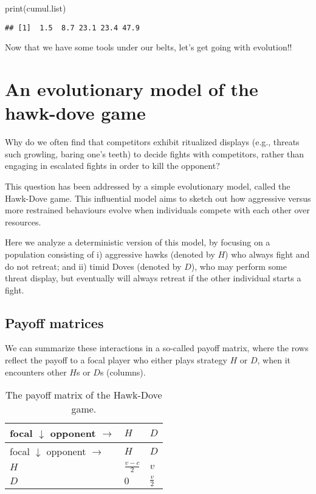 \documentclass[
]{book}
\newenvironment{Shaded}{\begin{snugshade}}{\end{snugshade}}
\newcommand{\FunctionTok}[1]{\textcolor[rgb]{0.00,0.00,0.00}{#1}}
\newcommand{\NormalTok}[1]{#1}
\begin{document}
\begin{Shaded}
\begin{Highlighting}[]
\FunctionTok{print}\NormalTok{(cumul.list)}
\end{Highlighting}
\end{Shaded}

\begin{verbatim}
## [1]  1.5  8.7 23.1 23.4 47.9
\end{verbatim}

Now that we have some tools under our belts, let's get going with evolution!!

\hypertarget{an-evolutionary-model-of-the-hawk-dove-game}{%
\chapter{An evolutionary model of the hawk-dove game}\label{an-evolutionary-model-of-the-hawk-dove-game}}

Why do we often find that competitors
exhibit ritualized displays
(e.g., threats such growling, baring one's teeth)
to decide fights with competitors,
rather than engaging in escalated fights in order to kill the opponent?

This question has been addressed by a simple evolutionary model,
called the Hawk-Dove game. This influential model aims to sketch out how
aggressive versus more restrained behaviours evolve
when individuals compete with each other over resources.

Here we analyze a deterministic version of this
model, by focusing on a population consisting of i) aggressive hawks (denoted by \(H\)) who
always fight and do not retreat; and ii) timid Doves (denoted by \(D\)), who may perform some
threat display, but eventually will always retreat if the other individual
starts a fight.

\hypertarget{payoff-matrices}{%
\section{Payoff matrices}\label{payoff-matrices}}

We can summarize these interactions in a so-called payoff matrix, where the rows
reflect the payoff to a focal player who either plays strategy \(H\) or \(D\), when it encounters other \(H\)s or \(D\)s (columns).

\begin{longtable}[]{@{}lll@{}}
\caption{\label{tab:payoffHD} The payoff matrix of the Hawk-Dove game.}\tabularnewline
\toprule
focal \(\downarrow\) opponent \(\rightarrow\) & \(H\) & \(D\) \\
\midrule
\endfirsthead
\toprule
focal \(\downarrow\) opponent \(\rightarrow\) & \(H\) & \(D\) \\
\midrule
\endhead
\(H\) & \(\frac{v-c}{2}\) & \(v\) \\
\(D\) & \(0\) & \(\frac{v}{2}\) \\
\bottomrule
\end{longtable}
\end{document}
